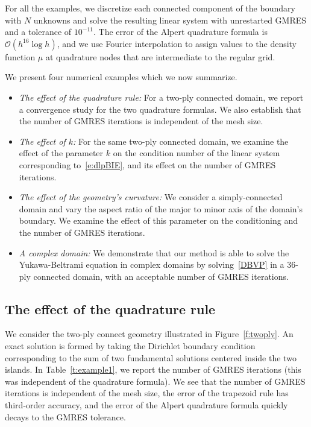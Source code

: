 For all the examples, we discretize each connected component of the
boundary with $N$ unknowns and solve the resulting linear system with
unrestarted GMRES and a tolerance of $10^{-11}$.  The error of the
Alpert quadrature formula is $\mathcal{O}(h^{16}\log h)$, and we use
Fourier interpolation to assign values to the density function $\mu$ at
quadrature nodes that are intermediate to the regular grid.

We present four numerical examples which we now summarize.
\begin{itemize}
  \item{\em{The effect of the quadrature rule}:} For a two-ply connected
  domain, we report a convergence study for the two quadrature formulas.
  We also establish that the number of GMRES iterations is independent
  of the mesh size.

  \item{\em{The effect of $k$}:} For the same two-ply connected domain,
  we examine the effect of the parameter $k$ on the condition number of
  the linear system corresponding to~\eqref{e:dlpBIE}, and its effect on
  the number of GMRES iterations.

  \item{\em{The effect of the geometry's curvature}:} We consider a
  simply-connected domain and vary the aspect ratio of the major to
  minor axis of the domain's boundary.  We examine the effect of this
  parameter on the conditioning and the number of GMRES iterations.

  \item{\em{A complex domain}:} We demonstrate that our method is able
  to solve the Yukawa-Beltrami equation in complex domains by
  solving~\eqref{DBVP} in a 36-ply connected domain, with an acceptable
  number of GMRES iterations.
\end{itemize}


\subsection{The effect of the quadrature rule}
We consider the two-ply connect geometry illustrated in
Figure~\ref{f:twoply}.  An exact solution is formed by taking the
Dirichlet boundary condition corresponding to the sum of two fundamental
solutions centered inside the two islands.  In Table~\ref{t:example1},
we report the number of GMRES iterations (this was independent of the
quadrature formula).  We see that the number of GMRES iterations is
independent of the mesh size, the error of the trapezoid rule has
third-order accuracy, and the error of the Alpert quadrature formula
quickly decays to the GMRES tolerance.

